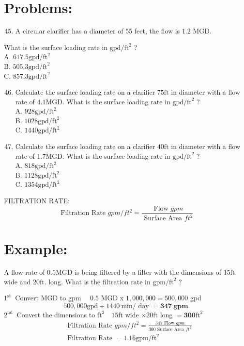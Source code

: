 \begin{enumerate}
\section{Problems:}
\begin{enumerate}
  \setcounter{enumi}{44}
  \item A circular clarifier has a diameter of 55 feet, the flow is $1.2$ MGD.
\end{enumerate}
What is the surface loading rate in $\mathrm{gpd} / \mathrm{ft}^{2}$ ?\\
A. $617.5 \mathrm{gpd} / \mathrm{ft}^{2}$\\
B. $505.3 \mathrm{gpd} / \mathrm{ft}^{2}$\\
C. $857.3 \mathrm{gpd} / \mathrm{ft}^{2}$

\begin{enumerate}
  \setcounter{enumi}{45}
  \item Calculate the surface loading rate on a clarifier $75 \mathrm{ft}$ in diameter with a flow rate of $4.1 \mathrm{MGD}$. What is the surface loading rate in $\mathrm{gpd} / \mathrm{ft}^{2}$ ?\\
A. $928 \mathrm{gpd} / \mathrm{ft}^{2}$\\
B. $1028 \mathrm{gpd} / \mathrm{ft}^{2}$\\
C. $1440 \mathrm{gpd} / \mathrm{ft}^{2}$

  \item Calculate the surface loading rate on a clarifier $40 \mathrm{ft}$ in diameter with a flow rate of $1.7 \mathrm{MGD}$. What is the surface loading rate in $\mathrm{gpd} / \mathrm{ft}^{2}$ ?\\
A. $818 \mathrm{gpd} / \mathrm{ft}^{2}$\\
B. $1128 \mathrm{gpd} / \mathrm{ft}^{2}$\\
C. $1354 \mathrm{gpd} / \mathrm{ft}^{2}$

\end{enumerate}
FILTRATION RATE:
$$
\text { Filtration Rate } g p m / f t^{2}=\frac{\text { Flow } g p m}{\text { Surface Area } f t^{2}}
$$

\section{Example:}
A flow rate of $0.5 \mathrm{MGD}$ is being filtered by a filter with the dimensions of $15 \mathrm{ft}$. wide and $20 \mathrm{ft}$. long. What is the filtration rate in $\mathrm{gpm} / \mathrm{ft}^{2}$ ?

$1^{\text {st }}$ Convert MGD to gpm $\quad 0.5$ MGD x $1,000,000=500,000$ gpd
$$
500,000 \mathrm{gpd} \div 1440 \mathrm{~min} / \text { day }=\mathbf{3 4 7} \mathbf{~ g p m}
$$
$2^{\text {nd }}$ Convert the dimensions to $\mathrm{ft}^{2} \quad 15 \mathrm{ft}$ wide $\times 20 \mathrm{ft}$ long $=\mathbf{3 0 0} \mathrm{ft}^{2}$
$$
\begin{aligned}
& \text { Filtration Rate } g p m / f t^{2}=\frac{347 \text { Flow } g p m}{300 \text { Surface Area } f t^{2}} \\
& \text { Filtration Rate }=1.16 \mathrm{gpm} / \mathrm{ft}^{2}
\end{aligned}
$$


\end{enumerate}
